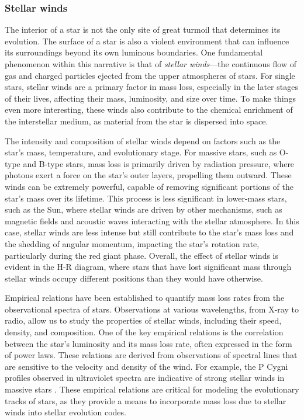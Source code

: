 \documentclass[main.tex]{subfiles}
\begin{document}
    \subsubsection{Stellar winds}
    The interior of a star is not the only site of great turmoil that determines its evolution. The surface of a star is also a violent environment that can influence its surroundings beyond its own luminous boundaries. One fundamental phenomenon within this narrative is that of \textit{stellar winds}---the continuous flow of gas and charged particles ejected from the upper atmospheres of stars. For single stars, stellar winds are a primary factor in mass loss, especially in the later stages of their lives, affecting their mass, luminosity, and size over time. To make things even more interesting, these winds also contribute to the chemical enrichment of the interstellar medium, as material from the star is dispersed into space.

    The intensity and composition of stellar winds depend on factors such as the star's mass, temperature, and evolutionary stage. For massive stars, such as O-type and B-type stars, mass loss is primarily driven by radiation pressure, where photons exert a force on the star's outer layers, propelling them outward. These winds can be extremely powerful, capable of removing significant portions of the star's mass over its lifetime.
    This process is less significant in lower-mass stars, such as the Sun, where stellar winds are driven by other mechanisms, such as magnetic fields and acoustic waves interacting with the stellar atmosphere. In this case, stellar winds are less intense but still contribute to the star's mass loss and the shedding of angular momentum, impacting the star's rotation rate, particularly during the red giant phase. Overall, the effect of stellar winds is evident in the H-R diagram, where stars that have lost significant mass through stellar winds occupy different positions than they would have otherwise.

    Empirical relations have been established to quantify mass loss rates from the observational spectra of stars. Observations at various wavelengths, from X-ray to radio, allow us to study the properties of stellar winds, including their speed, density, and composition. One of the key empirical relations is the correlation between the star's luminosity and its mass loss rate, often expressed in the form of power laws. These relations are derived from observations of spectral lines that are sensitive to the velocity and density of the wind. For example, the P Cygni profiles observed in ultraviolet spectra are indicative of strong stellar winds in massive stars \citep[e.g.][]{israelian:ssr99}. These empirical relations are critical for modeling the evolutionary tracks of stars, as they provide a means to incorporate mass loss due to stellar winds into stellar evolution codes.
\end{document}
